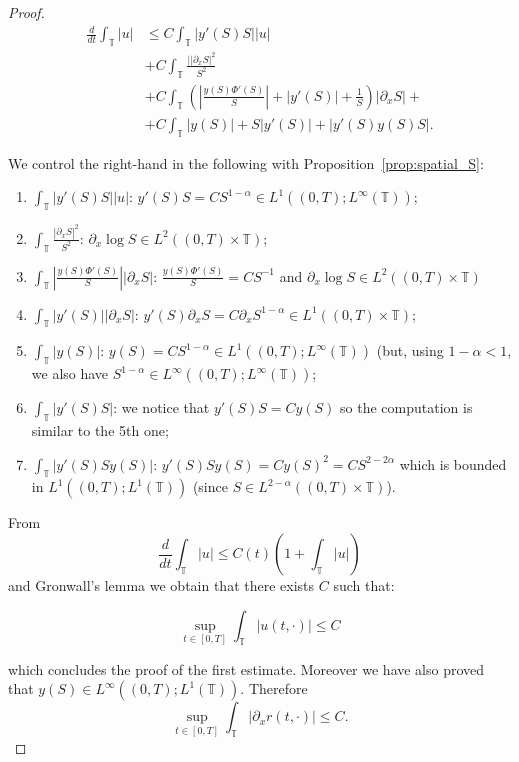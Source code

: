 \documentclass[a4paper,twosided, 11pt]{article}
\newcommand {\T}  { {\mathbb{T}} }
\theoremstyle{plain}
\theoremstyle{remark}
\numberwithin{equation}{section}
\begin{document}
\begin{proof}
\begin{equation}
\begin{split}
\frac{d}{dt}\int_{\T}|u| 
&\le C\int_{\T}|y'(S)S||u|\\
&+ C\int_{\T}\frac{||\partial_x S|^2}{S^2} \\
& + C\int_{\T}\left(\left|\frac{y(S)\Phi'(S)}{S}\right|+ |y'(S)| + \frac{1}{S}\right)|\partial_x S| +\\ &+ C\int_{\T}|y(S)|  + S|y'(S)| + |y'(S)y(S)S|.
\end{split}
\end{equation}



We control the right-hand in the following with Proposition~\ref{prop:spatial_S}:
\begin{enumerate}
\item $\int_{\T}|y'(S) S| |u|$:  $y'(S)S = C S^{1-\alpha}\in L^{1}((0,T); L^{\infty}(\T))$;
\item $\int_{\T}\frac{|\partial_x S|^2}{S^2}$: $\partial_x \log S\in L^{2}((0,T)\times \T)$; 
\item $\int_{\T}\left|\frac{y(S)\Phi'(S)}{S}\right||\partial_x S|$: $\frac{y(S)\Phi'(S)}{S}= C S^{-1}$ and $\partial_x \log S \in L^{2}((0,T)\times\T)$ 
\item $\int_{\T} |y'(S)||\partial_x S|$: $y'(S)\partial_x S = C \partial_x  S^{1-\alpha}\in L^{1}((0,T)\times \T)$; 
\item $\int_{\T}|y(S)|$: $y(S)=CS^{1-\alpha}\in L^{1}((0,T); L^{\infty}(\T))$ (but, using $1-\alpha<1$, we also have $S^{1-\alpha}\in L^{\infty}((0,T); L^{\infty}(\T))$; 
\item $\int_{\T}|y'(S)S|$: we notice that $y'(S)S=C y(S)$ so the computation is similar to the 5th one;
\item $\int_{\T}|y'(S)Sy(S)|$: $y'(S)Sy(S)= C y(S)^2= CS^{2-2\alpha}$ which is bounded in $L^{1}((0,T); L^1(\T))$ (since $S\in L^{2-\alpha}((0,T)\times \T)$).
\end{enumerate}

From 
$$
\frac{d}{dt}\int_{\T}|u|\le C(t) \left(1 + \int_{\T}|u|\right)
$$
and Gronwall's lemma we obtain that there exists $C$ such that: 

$$
\sup_{t\in[0,T]}\int_{\T}|u(t,\cdot)|\le C
$$

which concludes the proof of the first estimate. Moreover  we have also proved that $y(S)\in L^{\infty}((0,T); L^{1}(\T))$. Therefore
$$
\sup_{t\in[0,T]}\int_{\T}|\partial_xr(t,\cdot)|\le C. 
$$


\end{proof}
\end{document}
